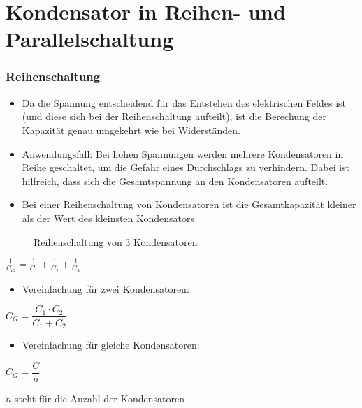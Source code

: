
\section{Kondensator in Reihen- und Parallelschaltung}
\label{section:reihe_parallel_kondensator}
\begin{frame}%

\frametitle{Reihenschaltung}
\begin{itemize}
  \item Da die Spannung entscheidend für das Entstehen des elektrischen Feldes ist (und diese sich bei der Reihenschaltung aufteilt), ist die Berechung der Kapazität genau umgekehrt wie bei Widerständen.
  \item Anwendungsfall: Bei hohen Spannungen werden mehrere Kondensatoren in Reihe geschaltet, um die Gefahr eines Durchschlags zu verhindern. Dabei ist hilfreich, dass sich die Gesamtspannung an den Kondensatoren aufteilt.
  \end{itemize}
\end{frame}

\begin{frame}\begin{itemize}
  \item Bei einer Reihenschaltung von Kondensatoren ist die Gesamtkapazität kleiner als der Wert des kleinsten Kondensators
  \end{itemize}

\begin{figure}
    \caption{\scriptsize Reihenschaltung von 3 Kondensatoren}
    \label{e_reihenschaltung_kondensatoren}
\end{figure}

$\frac{ 1 }{ C_{ G } } = \frac{ 1 }{ C_{ 1 } } + \frac{ 1 }{ C_{ 2 } } + \frac{ 1 }{ C_{ 3 } }$

\end{frame}

\begin{frame}\begin{itemize}
  \item Vereinfachung für zwei Kondensatoren:
  \end{itemize}
$C_{ G } = \dfrac{ C_{ 1 } \cdot C_{ 2 } }{ C_{ 1 } + C_{ 2 }}$

\end{frame}

\begin{frame}\begin{itemize}
  \item Vereinfachung für gleiche Kondensatoren:
  \end{itemize}
$C_{ G } = \dfrac{ C }{ n }$

$n$ steht für die Anzahl der Kondensatoren

\end{frame}

